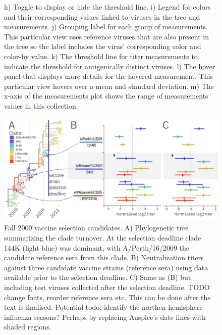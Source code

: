\documentclass[utf8]{FrontiersinHarvard} %
\begin{document}
\begin{figure}[h!]
{h) Toggle to display or hide the threshold line.
i) Legend for colors and their corresponding values linked to viruses in the tree and measurements.
j) Grouping label for each group of measurements.
This particular view uses reference viruses that are also present in the tree so the label includes the virus' corresponding color and color-by value.
k) The threshold line for titer measurements to indicate the threshold for antigenically distinct viruses.
l) The hover panel that displays more details for the hovered measurement.
This particular view hovers over a mean and standard deviation.
m) The x-axis of the measurements plot shows the range of measurements values in this collection.
  }\label{fig:2}
\end{figure}




\begin{figure}[h!]
  \begin{center}
    \includegraphics[width=\textwidth]{figures/figure-3.jpg}
  \end{center}
  \caption{
    Fall 2009 vaccine selection candidates.
    A) Phylogenetic tree summarizing the clade turnover. At the selection deadline clade 144K (light blue) was dominant, with A/Perth/16/2009 the candidate reference sera from this clade.
    B) Neutralization titers against three candidate vaccine strains (reference sera) using data available prior to the selection deadline.
    C) Same as (B) but including test viruses collected after the selection deadline.
    \break
    TODO change fonts, reorder reference sera etc. This can be done after the text is finalised.
    \break
    Potential todo: identify the northen hemisphere influenza seasons? Perhaps by replacing Auspice's date lines with shaded regions.
  }
  \label{fig:3}
\end{figure}
\end{document}
